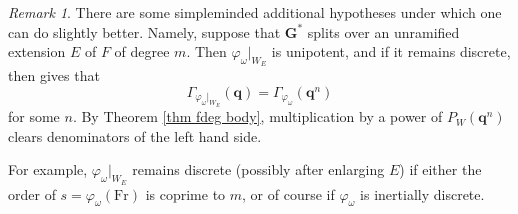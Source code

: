\documentclass[10pt]{article}
\newcommand{\trace}[2]{\mathrm{trace}\left({#1}\,,{#2}\right)}
\newcommand{\G}{\mathbf{G}}
\newcommand{\triv}{\mathrm{triv}}
\newcommand{\bq}{\mathbf{q}}
\newtheorem{theorem}{Theorem}
\theoremstyle{definition}
\theoremstyle{remark}
\newtheorem{rem}{Remark}
\begin{document}
%
\begin{rem}
\label{rem extension to quasi-split}
There are some simpleminded additional hypotheses under which one can do slightly better.
Namely, suppose that $\G^*$ splits over an unramified extension $E$ of $F$ of degree $m$.
Then $\varphi_\omega|_{W_E}$ is unipotent, and if it remains discrete, then \cite{Solleveldfdegsequel} gives 
that
%
\[
\Gamma_{\varphi_\omega|_{W_{E}}}(\bq)=\Gamma_{\varphi_{\omega}}(\bq^n)
\]
%
for some $n$. By Theorem \ref{thm fdeg body}, multiplication by a power of
$P_W(\bq^n)$ clears denominators of the left hand side. 

For example, $\varphi_\omega|_{W_E}$ remains discrete (possibly after enlarging $E$) if either the order of 
$s=\varphi_{\omega}(\mathrm{Fr})$ is coprime to $m$, or of course if $\varphi_{\omega}$ is inertially discrete. 
\end{rem}

%
%
\end{document}
